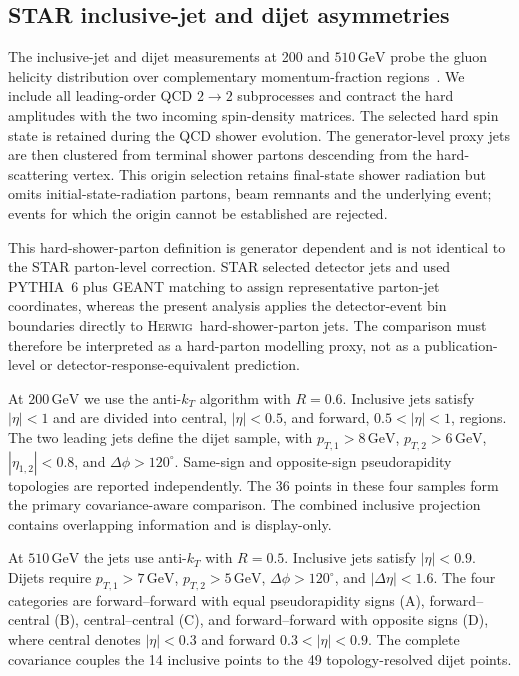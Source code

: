 \documentclass[11pt,a4paper]{article}
\newcommand{\Herwig}{\textsc{Herwig}}
\newcommand{\GeV}{\ensuremath{\,\mathrm{GeV}}}
\begin{document}
\FloatBarrier
\subsection{STAR inclusive-jet and dijet asymmetries}
\label{sec:star-jets}

The inclusive-jet and dijet measurements at 200 and $510\GeV$ probe the
gluon helicity distribution over complementary momentum-fraction
regions~\cite{STAR:2021jets,STAR:2022jets}.  We include all leading-order QCD
$2\to2$ subprocesses and contract the hard amplitudes with the two incoming
spin-density matrices.  The selected hard spin state is retained during the
QCD shower evolution.  The generator-level proxy jets are then clustered from
terminal shower partons descending from the hard-scattering vertex.  This
origin selection retains final-state shower radiation but omits
initial-state-radiation partons, beam remnants and the underlying event;
events for which the origin cannot be established are rejected.

This hard-shower-parton definition is generator dependent and is not
identical to the STAR parton-level correction.  STAR selected detector jets
and used PYTHIA~6 plus GEANT matching to assign representative parton-jet
coordinates, whereas the present analysis applies the detector-event bin
boundaries directly to \Herwig\ hard-shower-parton jets.  The comparison must
therefore be interpreted as a hard-parton modelling proxy, not as a
publication-level or detector-response-equivalent prediction.

At $200\GeV$ we use the anti-$k_T$ algorithm with $R=0.6$.  Inclusive jets
satisfy $|\eta|<1$ and are divided into central, $|\eta|<0.5$, and forward,
$0.5<|\eta|<1$, regions.  The two leading jets define the dijet sample, with
$p_{T,1}>8\GeV$, $p_{T,2}>6\GeV$, $|\eta_{1,2}|<0.8$, and
$\Delta\phi>120^\circ$.  Same-sign and opposite-sign pseudorapidity
topologies are reported independently.  The 36 points in these four samples
form the primary covariance-aware comparison.  The combined inclusive
projection contains overlapping information and is display-only.

At $510\GeV$ the jets use anti-$k_T$ with $R=0.5$.  Inclusive jets satisfy
$|\eta|<0.9$.  Dijets require $p_{T,1}>7\GeV$,
$p_{T,2}>5\GeV$, $\Delta\phi>120^\circ$, and
$|\Delta\eta|<1.6$.  The four categories are forward--forward with equal
pseudorapidity signs (A), forward--central (B), central--central (C), and
forward--forward with opposite signs (D), where central denotes
$|\eta|<0.3$ and forward $0.3<|\eta|<0.9$.  The complete covariance couples
the 14 inclusive points to the 49 topology-resolved dijet points.
\end{document}
